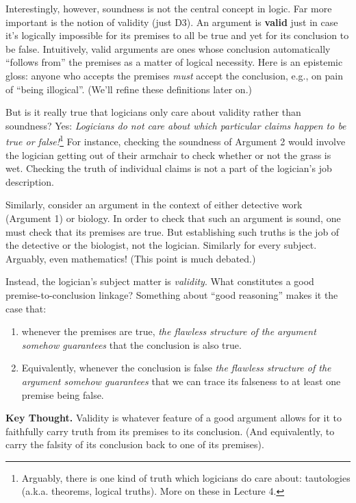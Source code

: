 \documentclass[options]{philosophersimprint}
\theoremstyle{definition}
\begin{document}
Interestingly, however, soundness is not the central concept in logic. Far more important is the notion of validity (just D3). An argument is \textbf{valid} just in case it's logically impossible for its premises to all be true and yet for its conclusion to be false. Intuitively, valid arguments are ones whose conclusion automatically ``follows from'' the premises as a matter of logical necessity. Here is an epistemic gloss: anyone who accepts the premises \textit{must} accept the conclusion, e.g., on pain of ``being illogical''. (We'll refine these definitions later on.)

But is it really true that logicians only care about validity rather than soundness? Yes: \textit{Logicians do not care about which particular claims happen to be true or false!}\footnote{Arguably, there is one kind of truth which logicians do care about: tautologies (a.k.a. theorems, logical truths). More on these in Lecture 4.} For instance, checking the soundness of Argument 2 would involve the logician getting out of their armchair to check whether or not the grass is wet. Checking the truth of individual claims is not a part of the logician's job description.

Similarly, consider an argument in the context of either detective work (Argument 1) or biology. In order to check that such an argument is sound, one must check that its premises are true. But establishing such truths is the job of the detective or the biologist, not the logician. Similarly for every subject. Arguably, even mathematics! (This point is much debated.)

Instead, the logician's subject matter is \textit{validity}. What constitutes a good premise-to-conclusion linkage? Something about ``good reasoning'' makes it the case that:
\begin{enumerate}
    \item whenever the premises are true, \textit{the flawless structure of the argument somehow guarantees} that the conclusion is also true.
    \item Equivalently, whenever the conclusion is false \textit{the flawless structure of the argument somehow guarantees} that we can trace its falseness to at least one premise being false.
\end{enumerate}

\textbf{Key Thought.} Validity is whatever feature of a good argument allows for it to faithfully carry truth from its premises to its conclusion. (And equivalently, to carry the falsity of its conclusion back to one of its premises).
\end{document}
